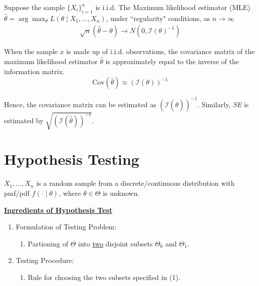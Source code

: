 \documentclass[11pt]{elegantbook}
\begin{document}
\begin{theorem}
    Suppose the sample $\{X_i\}_{i=1}^n$ is i.i.d. The Maximum likelihood estimator (MLE) $\hat{\theta}=\arg\max_\theta L(\theta\mid X_1,...,X_n)$, under ``regularity" conditions, as $n \rightarrow \infty$
    \begin{equation}
        \begin{aligned}
            \sqrt{n}\left(\hat{\theta}-\theta\right) \rightarrow N(0,\mathcal{I}(\theta)^{-1})
        \end{aligned}
        \nonumber
    \end{equation}
\end{theorem}
\begin{proposition}
    When the sample $x$ is made up of i.i.d. observations, the covariance matrix of the maximum likelihood estimator $\hat{\theta}$ is approximately equal to the inverse of the information matrix. $$\text{Cov}(\hat{\theta})\approx(\mathcal{I}(\theta))^{-1}$$
\end{proposition}
Hence, the covariance matrix can be estimated as $(\mathcal{I}(\hat{\theta}))^{-1}$. Similarly, \textit{SE} is estimated by $\sqrt{(\mathcal{I}(\hat{\theta}))^{-1}}$.







\section{Hypothesis Testing}
$X_1,...,X_n$ is a random sample from a discrete/continuous distribution with pmf/pdf $f(\cdot\mid \theta)$, where $\theta\in\Theta$ is unknown.

\textbf{\underline{Ingredients of Hypothesis Test}}
\begin{enumerate}[(1).]
    \item Formulation of Testing Problem:
    \begin{enumerate}[$\circ$]
        \item Partioning of $\Theta$ into \underline{two} disjoint subsets $\Theta_0$ and $\Theta_1$.
    \end{enumerate}
    \item Testing Procedure:
    \begin{enumerate}[$\circ$]
        \item Rule for choosing the two subsets specified in (1).
    \end{enumerate}
\end{enumerate}
\end{document}
